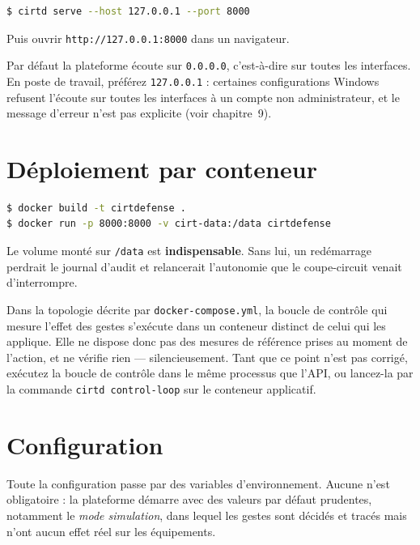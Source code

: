 \begin{lstlisting}[language=bash]
$ cirtd serve --host 127.0.0.1 --port 8000
\end{lstlisting}

Puis ouvrir \texttt{http://127.0.0.1:8000} dans un navigateur.

\begin{tcolorbox}[colback=green!4!white, colframe=darkgreen,
  title=\textbf{Bon à savoir}, fonttitle=\bfseries, boxrule=0.6pt]
Par défaut la plateforme écoute sur \texttt{0.0.0.0}, c'est-à-dire sur toutes
les interfaces. En poste de travail, préférez \texttt{127.0.0.1} : certaines
configurations Windows refusent l'écoute sur toutes les interfaces à un compte
non administrateur, et le message d'erreur n'est pas explicite
(voir chapitre~9).
\end{tcolorbox}

\section{Déploiement par conteneur}

\begin{lstlisting}[language=bash]
$ docker build -t cirtdefense .
$ docker run -p 8000:8000 -v cirt-data:/data cirtdefense
\end{lstlisting}

Le volume monté sur \texttt{/data} est \textbf{indispensable}. Sans lui, un
redémarrage perdrait le journal d'audit et relancerait l'autonomie que le
coupe-circuit venait d'interrompre.

\begin{tcolorbox}[colback=red!4!white, colframe=darkred,
  title=\textbf{Limitation connue}, fonttitle=\bfseries, boxrule=0.6pt]
Dans la topologie décrite par \texttt{docker-compose.yml}, la boucle de
contrôle qui mesure l'effet des gestes s'exécute dans un conteneur distinct de
celui qui les applique. Elle ne dispose donc pas des mesures de référence
prises au moment de l'action, et ne vérifie rien --- silencieusement. Tant que
ce point n'est pas corrigé, exécutez la boucle de contrôle dans le même
processus que l'API, ou lancez-la par la commande \texttt{cirtd control-loop}
sur le conteneur applicatif.
\end{tcolorbox}

\section{Configuration}

Toute la configuration passe par des variables d'environnement. Aucune n'est
obligatoire : la plateforme démarre avec des valeurs par défaut prudentes,
notamment le \emph{mode simulation}, dans lequel les gestes sont décidés et
tracés mais n'ont aucun effet réel sur les équipements.

